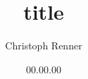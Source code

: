 \documentclass[a4paper,12pt,twoside,DIV=14,BCOR=20mm,headsepline,titlepage=true,openright,final,english]{scrbook}
\title{title}%
\author{Christoph Renner}
\date{00.00.00}
\begin{document}

\cleardoublepage

\frontmatter


\cleardoublepage


\cleardoublepage
  
\mainmatter


\cleardoublepage

\tableofcontents

\renewcommand{\arraystretch}{1.2}  

%
%
%
%
%
%

\appendix
%

 
\listoftables
\listoffigures




\backmatter

%
 
\end{document}
